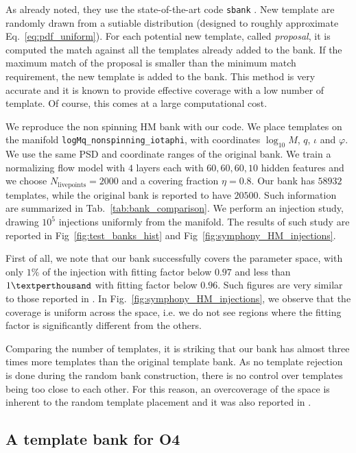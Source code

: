 \documentclass[twocolumn,showpacs,preprintnumbers,nofootinbib,prd,
superscriptaddress,10pt]{revtex4-2}
\begin{document}
As already noted, they use the state-of-the-art code \texttt{sbank} \cite{Ajith:2012mn, PhysRevD.80.104014}. New template are randomly drawn from a sutiable distribution (designed to roughly approximate Eq.~\eqref{eq:pdf_uniform}). For each potential new template, called {\it proposal}, it is computed the match against all the templates already added to the bank. If the maximum match of the proposal is smaller than the minimum match requirement, the new template is added to the bank. This method is very accurate and it is known to provide effective coverage with a low number of template. Of course, this comes at a large computational cost.

We reproduce the non spinning HM bank with our code. We place templates on the manifold \texttt{logMq\_nonspinning\_iotaphi}, with coordinates $\log_{10}M$, $q$, $\iota$ and $\varphi$. We use the same PSD and coordinate ranges of the original bank.
We train a normalizing flow model with $4$ layers each with $60, 60, 60, 10$ hidden features and we choose $N_\text{livepoints} = 2000$ and a covering fraction $\eta = 0.8$.
Our bank has $58932$ templates, while the original bank is reported to have $20500$.
Such information are summarized in Tab.~\ref{tab:bank_comparison}.
We perform an injection study, drawing $10^5$ injections uniformly from the manifold. The results of such study are reported in Fig~\ref{fig:test_banks_hist} and Fig~\ref{fig:symphony_HM_injections}.

First of all, we note that our bank successfully covers the parameter space, with only $1\%$ of the injection with fitting factor below $0.97$ and less than $1\textperthousand$ with fitting factor below $0.96$. Such figures are very similar to those reported in \cite{Harry:2017weg}.
In Fig.~\ref{fig:symphony_HM_injections}, we observe that the coverage is uniform across the space, i.e. we do not see regions where the fitting factor is significantly different from the others.

Comparing the number of templates, it is striking that our bank has almost three times more templates than the original template bank.
As no template rejection is done during the random bank construction, there is no control over templates being too close to each other. For this reason, an overcoverage of the space is inherent to the random template placement and it was also reported in \cite{Messenger:2008ta,Coogan:2022qxs}.

\subsection{A template bank for O4} \label{sec:all_sky_comparison}
\end{document}
